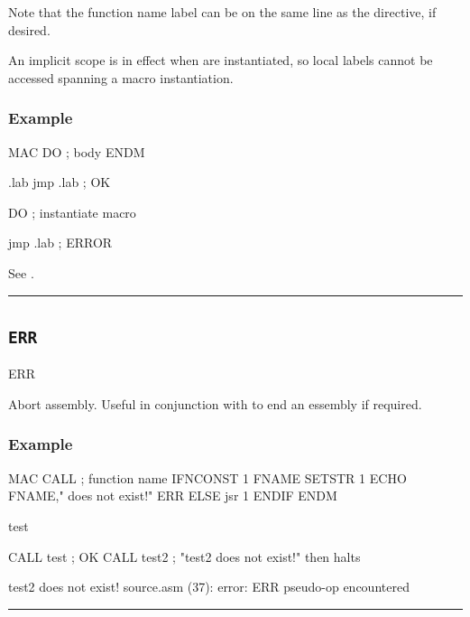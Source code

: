 Note that the function name label can be on the same line as the directive, if desired.

An implicit  scope is in effect when  are instantiated, so local labels cannot be accessed spanning a macro instantiation.\\

\subsubsection{Example}

\begin{code}
  MAC DO
  ; body
  ENDM

.lab
  jmp .lab     ; OK
  
  DO  ; instantiate macro
  
  jmp .lab     ; ERROR
\end{code}

See .


\hrule
\subsection{\texttt{ERR}}
\label{pseudoop:err}

\begin{usage}
  ERR
\end{usage}

Abort assembly. Useful in conjunction with  to end an essembly if required.

\subsubsection{Example}

\begin{code}
  MAC CALL ; function name
    IFNCONST {1}
FNAME SETSTR {1}
      ECHO FNAME," does not exist!"
      ERR
    ELSE
      jsr {1}
    ENDIF
  ENDM

test

  CALL test         ; OK
  CALL test2        ; "test2 does not exist!" then halts
\end{code}

\begin{outputx}
test2 does not exist!
source.asm (37): error: ERR pseudo-op encountered
\end{outputx}

\hrule



